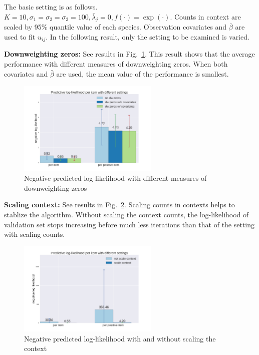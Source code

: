 \documentclass{article}
\begin{document}
The basic setting is as follows. $K = 10, \sigma_1 = \sigma_2 = \sigma_3 = 100, \bar{\lambda}_j = 0, f(\cdot) = \exp(\cdot)$. Counts in context are scaled by 95\% quantile value of each species. Observation covariates and $\bar{\beta}$ are used to fit $u_{ij}$. In the following result, only the setting to be examined is varied. 

{\bf Downweighting zeros:} See results in Fig.~\ref{fig_dwz}. This result shows that the average performance with different measures of downweighting zeros. When both covariates and $\bar{\beta}$ are used, the mean value of the performance is smallest.   

\begin{figure}[t]
    \centering
    \includegraphics[width=0.6\textwidth]{figures/dwz.png}
    \caption{Negative predicted log-likelihood with different measures of downweighting zeros}
    \label{fig_dwz}
\end{figure}


{\bf Scaling context:} See results in Fig.~\ref{fig_scaling}. Scaling counts in contexts helps to stablize the algorithm. Without scaling the context counts, the log-likelihood of validation set stops increasing before much less iterations than that of the setting with scaling counts. 
\begin{figure}[t]
    \centering
    \includegraphics[width=0.6\textwidth]{figures/scale_context.png}
    \caption{Negative predicted log-likelihood with and without scaling the context}
    \label{fig_scaling}
\end{figure}
\end{document}
